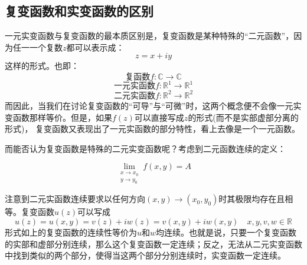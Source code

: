 \documentclass[12pt, a4paper, oneside]{ctexart}
\begin{document}
\subsection{复变函数和实变函数的区别}
一元实变函数与复变函数的最本质区别是，复变函数是某种特殊的“二元函数”，因为任一一个复数$z$都可以表示成：
$$
z=x+iy
$$
这样的形式。也即：
$$
\text{复函数}f: \mathbb{C} \rightarrow \mathbb{C}
$$
$$
\text{一元实函数}f: \mathbb{R}^1 \rightarrow \mathbb{R}^1
$$
$$
\text{二元实函数}f: \mathbb{R}^2 \rightarrow \mathbb{R}^2
$$
而因此，当我们在讨论复变函数的“可导”与“可微”时，这两个概念便不会像一元实变函数那样等价。但是，如果$f(z)$可以直接写成$z$的形式(而不是实部虚部分离的形式)，
复变函数又表现出了一元实函数的部分特性，看上去像是一个一元函数。

而能否认为复变函数是特殊的二元实变函数呢？考虑到二元函数连续的定义：

\begin{equation*}
    \lim _{\substack{x \rightarrow x_{0} \\ y \rightarrow y_{0}}} f(x, y)=A
\end{equation*}


注意到二元实函数连续要求以任何方向$(x,y)\to(x_0,y_0)$时其极限均存在且相等。复变函数$u(z)$可以写成
$$
u(z)=u(x,y)=v(z)+iw(z)=v(x,y)+iw(x,y) \quad x,y,v,w \in \mathbb{R}
$$
形式如上的复变函数的连续性等价为$u$和$w$均连续。也就是说，只要一个复变函数的实部和虚部分别连续，那么这个复变函数一定连续；反之，无法从二元实变函数中找到类似的两个部分，使得当这两个部分分别连续时，实变函数一定连续。
\end{document}
